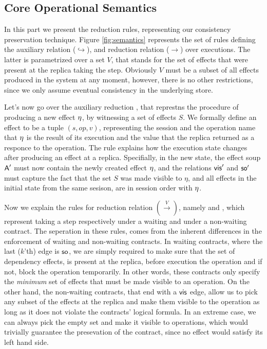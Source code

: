 \subsection{Core Operational Semantics}



In this part we present the reduction rules, representing our
consistency preservation technique.
Figure \ref{fig:semantics} represents the set of rules defining the
auxiliary relation ($\hookrightarrow$), and reduction relation 
($\rightarrow$) over executions. The latter is parametrized over a set $V$,
that stands for the set of effects that were present at the replica
taking the step. Obviously $V$ must be a subset of all effects produced
in the system at any moment, however, there is no other restrictions,
since we only assume eventual consistency in the underlying store.

Let's now go over the auxiliary reduction 
,
that represtns the procedure of producing a new effect $\eta$, by witnessing a set
of effects $S$. 
We formally define an effect to be a tuple $(s,op,v)$, representing the
session and the operation name that $\eta$ is the result of its execution and the value
that the replica returned as a responce to the operation.
The rule explains how the execution state changes after producing an
effect at a replica. Specifially, in the new state, the effect soup
${\normalfont \textsf{A}}'$ must
now contain the newly created effect $\eta$, and the relations ${\normalfont \textsf{vis}}'$
and ${\normalfont \textsf{so}}'$ must capture the fact that the set $S$ was made
visible to $\eta$, and all effects in the initial state from the same
sesison, are in session order with $\eta$.


Now we explain the rules for reduction relation $(\xrightarrow{V})$,
namely   and
, which represent taking a step respectively
under a waiting and under a non-waiting contract. The seperation in
these rules, comes from the inherent differences in the enforcement of
waiting and non-waiting contracts. In waiting contracts, where the last
($k$'th) edge is ${\normalfont \textsf{so}}$, we are simply required to make sure that the
set of dependency effects, is
present at the replica, before execution the operation and if not, block
the operation temporarily. In other words, these contracts only specify
the \emph{minimum} set of effects that must be made visible to an
operation. On the other hand, the non-waiting contracts, that end with a
${\normalfont \textsf{vis}}$ edge, allow us to pick any subset of the  effects at the
replica and make them visible to the operation as long as it does not
violate the contracts' logical formula. In an extreme case, we can
always pick the empty set and make it visible to operations, which
would trivially guarantee the presevation of the contract, since no effect
would satisfy its left hand side. 

